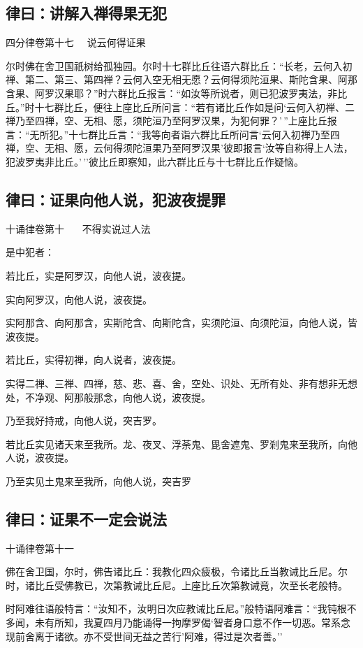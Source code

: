\documentclass{book}
\begin{document}
\subsection{律曰：讲解入禅得果无犯}

四分律卷第十七~~ 说云何得证果

尔时佛在舍卫国祇树给孤独园。尔时十七群比丘往语六群比丘：``长老，云何入初禅、第二、第三、第四禅？云何入空无相无愿？云何得须陀洹果、斯陀含果、阿那含果、阿罗汉果耶？''时六群比丘报言：``如汝等所说者，则已犯波罗夷法，非比丘。''时十七群比丘，便往上座比丘所问言：``若有诸比丘作如是问`云何入初禅、二禅乃至四禅，空、无相、愿，须陀洹乃至阿罗汉果，为犯何罪？'\,''上座比丘报言：``无所犯。''十七群比丘言：``我等向者诣六群比丘所问言`云何入初禅乃至四禅，空、无相、愿，云何得须陀洹果乃至阿罗汉果'彼即报言`汝等自称得上人法，犯波罗夷非比丘。'\,''彼比丘即察知，此六群比丘与十七群比丘作疑恼。

\subsection{律曰：证果向他人说，犯波夜提罪}

十诵律卷第十~~~ 不得实说过人法

是中犯者：

若比丘，实是阿罗汉，向他人说，波夜提。

实向阿罗汉，向他人说，波夜提。

实阿那含、向阿那含，实斯陀含、向斯陀含，实须陀洹、向须陀洹，向他人说，皆波夜提。

若比丘，实得初禅，向人说者，波夜提。

实得二禅、三禅、四禅，慈、悲、喜、舍，空处、识处、无所有处、非有想非无想处，不净观、阿那般那念，向他人说，波夜提。

乃至我好持戒，向他人说，突吉罗。

若比丘实见诸天来至我所。龙、夜叉、浮荼鬼、毘舍遮鬼、罗剎鬼来至我所，向他人说，波夜提。

乃至实见土鬼来至我所，向他人说，突吉罗

\subsection{律曰：证果不一定会说法}

十诵律卷第十一

佛在舍卫国，尔时，佛告诸比丘：我教化四众疲极，令诸比丘当教诫比丘尼。尔时，诸比丘受佛教已，次第教诫比丘尼。上座比丘次第教诫竟，次至长老般特。

时阿难往语般特言：``汝知不，汝明日次应教诫比丘尼。''般特语阿难言：``我钝根不多闻，未有所知，我夏四月乃能诵得一拘摩罗偈`智者身口意不作一切恶。常系念现前舍离于诸欲。亦不受世间无益之苦行'阿难，得过是次者善。''
\end{document}
